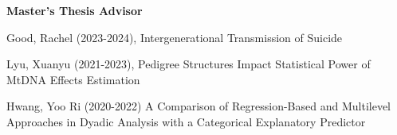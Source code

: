 {\large\textbf{Master's Thesis Advisor}}
\begin{etaremune}%
\item Good, Rachel  (2023-2024), Intergenerational Transmission of Suicide%
\item Lyu, Xuanyu  (2021-2023), Pedigree Structures Impact Statistical Power of MtDNA Effects Estimation%
\item Hwang, Yoo Ri (2020-2022) A Comparison of Regression-Based and Multilevel Approaches in Dyadic Analysis with a Categorical Explanatory Predictor%
\end{etaremune}%
